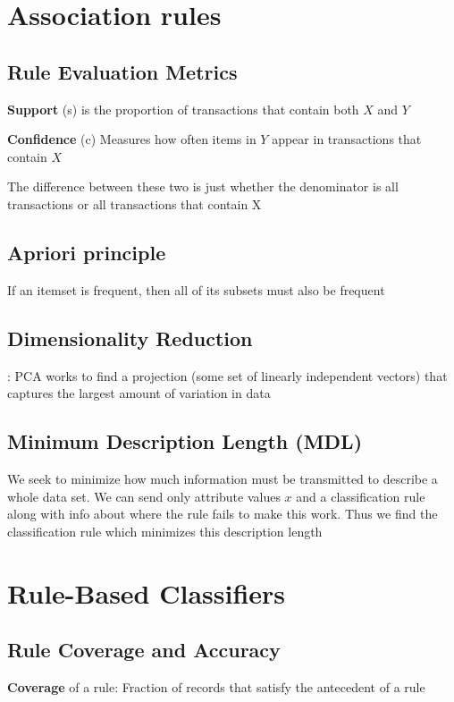 \documentclass[12pt]{amsart}
\begin{document}
\section{Association rules}


\subsection{Rule Evaluation Metrics}
\textbf{Support} (s) is the proportion of transactions that contain both $X$ and $Y$

\textbf{Confidence} (c) Measures how often items in $Y$ appear in transactions that contain $X$

The difference between these two is just whether the denominator is all transactions or all transactions that contain X

\subsection{Apriori principle}
If an itemset is frequent, then all of its subsets must also
be frequent


\subsection{Dimensionality Reduction}: 
PCA works to find a projection (some set of linearly independent vectors) that captures the largest amount of variation in data

\subsection{Minimum Description Length (MDL)}
We seek to minimize how much information must be transmitted to describe a whole data set. We can send only attribute values $x$ and a classification rule along with info about where the rule fails to make this work. Thus we find the classification rule which minimizes this description length


\section{Rule-Based Classifiers}

\subsection{Rule Coverage and Accuracy}
\textbf{Coverage} of a rule:
Fraction of records
that satisfy the
antecedent of a rule
\end{document}
